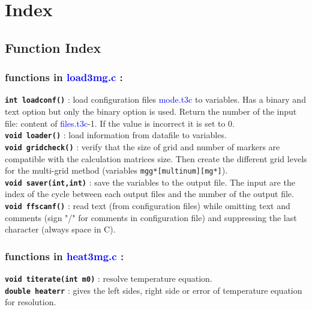 
\section{Index}

\subsection{Function Index}

\subsubsection*{functions in \textcolor{blue}{load3mg.c} :}

\textbf{\texttt{int loadconf()}} : load configuration files \textcolor{blue}{mode.t3c} to variables. Has a binary and text option but only the binary option is used. Return the number of the input file: content of \textcolor{blue}{files.t3c}-1. If the value is incorrect it is set to 0.
\\
\textbf{\texttt{void loader()}} : load information from datafile to variables.
\\
\textbf{\texttt{void gridcheck()}} : verify that the size of grid and number of markers are compatible with the calculation matrices size. Then create the different grid levels for the multi-grid method (variables \texttt{mgg*[multinum][mg*]}). 
\\
\textbf{\texttt{void saver(int,int)}} : save the variables to the output file. The input are the index of the cycle between each output files and the number of the output file.
\\
\textbf{\texttt{void ffscanf()}} : read text (from configuration files) while omitting text and comments (sign "/" for comments in configuration file) and suppressing the last character (always space in C).
\\

\subsubsection*{functions in \textcolor{blue}{heat3mg.c} :}

\textbf{\texttt{void titerate(int m0)}} : resolve temperature equation.
\\
\textbf{\texttt{double heaterr}} : gives the left sides, right side or error of temperature equation for resolution.
\\

